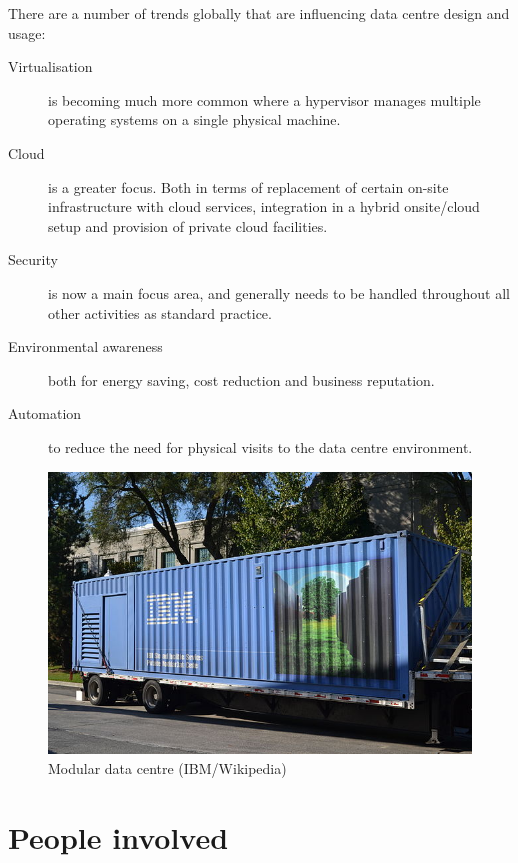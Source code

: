 There are a number of trends globally that are influencing data centre design and usage:
\begin{description}
\item[Virtualisation] is becoming much more common where a hypervisor manages multiple operating systems on a single physical machine. 
\item[Cloud] is a greater focus.  Both in terms of replacement of certain on-site infrastructure with cloud services, integration in a hybrid onsite/cloud setup and provision of private cloud facilities.
\item[Security] is now a main focus area, and generally needs to be handled throughout all other activities as standard practice.
\item[Environmental awareness] both for energy saving, cost reduction and business reputation. 
\item[Automation] to reduce the need for physical visits to the data centre environment.
\end{description}

\begin{figure}[htbp]
  \centering
  \includegraphics[width=1.0\linewidth]{modular_data_centre}
  \caption{Modular data centre (IBM/Wikipedia)}
  \label{fig:modular-data-centre}
\end{figure}

\section{People involved}

